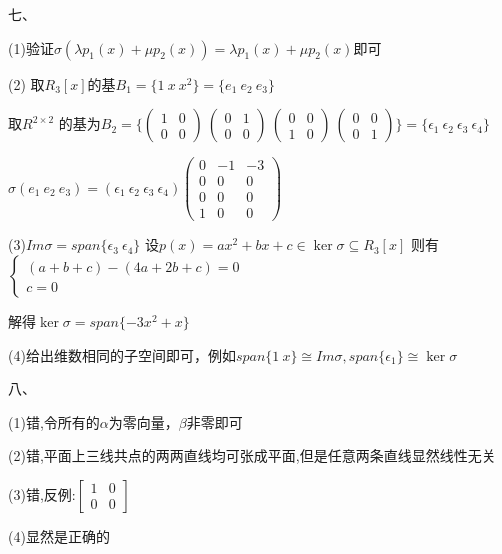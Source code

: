 \documentclass[UTF8]{article}
\begin{document}
\par
七、
\par
   (1)验证$\sigma (\lambda p_1(x)+\mu p_2(x))=\lambda p_1(x)+\mu p_2(x)$即可
\par
   (2) 取$R_3[x]$的基$B_1=\{1 \ x \  x^2\}=\{e_1 \ e_2\ e_3 \}$
   \par
   取$R^{2\times2}$
   的基为$B_2=\{\left(\begin{matrix}1&0\\0&0\end{matrix}\right) \ \left(\begin{matrix}0&1\\0&0\end{matrix}\right) \ \left(\begin{matrix}0&0\\1&0\end{matrix}\right) \ 
   \left(\begin{matrix}0&0\\0&1\end{matrix}\right) \}=\{\epsilon_1 \ \epsilon_2 \ \epsilon_3 \ \epsilon_4 \}$
   \par
   $\sigma(e_1 \ e_2\ e_3 )=(\epsilon_1 \ \epsilon_2 \ \epsilon_3 \ \epsilon_4 )\left(\begin{matrix}0&-1&-3\\0&0&0\\0&0&0\\1&0&0\end{matrix}\right)$
   \par
   (3)$Im\sigma=span\{\epsilon_3 \ \epsilon_4\}$
      设$p(x)=ax^2+bx+c\in \ker\sigma\subseteq R_3[x]$
      则有$\begin{cases}(a+b+c)-(4a+2b+c)=0\\c=0\end{cases}$
      \par
      解得$\ker\sigma=span\{-3x^2+x\}$
    \par
    (4)给出维数相同的子空间即可，例如$span\{1 \ x\}\cong Im\sigma,span\{\epsilon_1\}\cong \ker\sigma$
\par
八、
\par
   (1)错,令所有的$\alpha$为零向量，$\beta$非零即可
   \par
   (2)错,平面上三线共点的两两直线均可张成平面,但是任意两条直线显然线性无关
   \par
   (3)错,反例:$\begin{bmatrix}1&0\\0&0\end{bmatrix}$
   \par
   (4)显然是正确的
\end{document}
